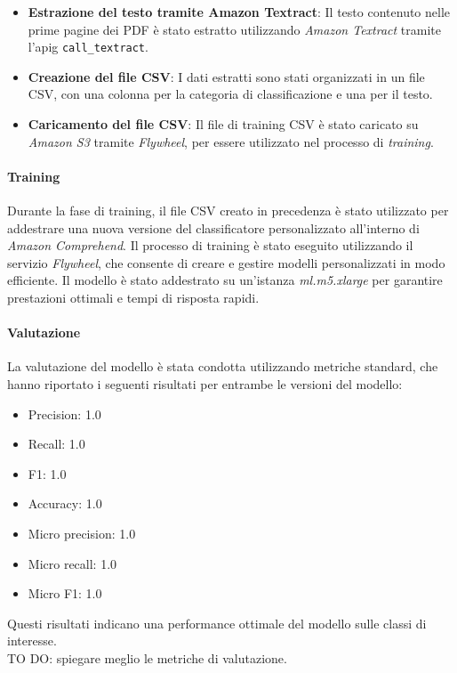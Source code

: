 \begin{itemize}
    \item \textbf{Estrazione del testo tramite Amazon Textract}: Il testo contenuto nelle prime pagine dei PDF è stato estratto utilizzando \emph{Amazon Textract} tramite l'\gls{apig} \texttt{call\_textract}. 
    \item \textbf{Creazione del file CSV}: I dati estratti sono stati organizzati in un file CSV, con una colonna per la categoria di classificazione e una per il testo.
    \item \textbf{Caricamento del file CSV}: Il file di training CSV è stato caricato su \emph{Amazon S3} tramite \emph{Flywheel}, per essere utilizzato nel processo di \emph{training}.
\end{itemize}

\paragraph*{Training}
Durante la fase di {training}, il file CSV creato in precedenza è stato utilizzato per addestrare una nuova versione del classificatore personalizzato all'interno di \emph{Amazon Comprehend}. Il processo di training è stato eseguito utilizzando il servizio \emph{Flywheel}, che consente di creare e gestire modelli personalizzati in modo efficiente. Il modello è stato addestrato su un'istanza \emph{ml.m5.xlarge} per garantire prestazioni ottimali e tempi di risposta rapidi.

\paragraph*{Valutazione}
La valutazione del modello è stata condotta utilizzando metriche standard, che hanno riportato i seguenti risultati per entrambe le versioni del modello:
\begin{itemize}
    \item Precision: 1.0
    \item Recall: 1.0
    \item F1: 1.0
    \item Accuracy: 1.0
    \item Micro precision: 1.0
    \item Micro recall: 1.0
    \item Micro F1: 1.0
\end{itemize}
Questi risultati indicano una performance ottimale del modello sulle classi di interesse.\\
TO DO: spiegare meglio le metriche di valutazione.

